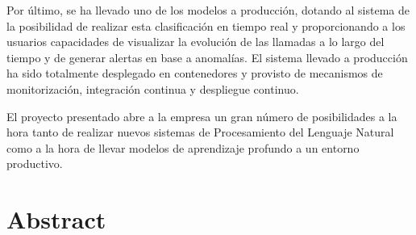  Por último, se ha llevado uno de los modelos a producción, dotando al sistema de la posibilidad de realizar esta clasificación en tiempo real y proporcionando a los usuarios capacidades de visualizar la evolución de las llamadas a lo largo del tiempo y de generar alertas en base a anomalías. El sistema llevado a producción ha sido totalmente desplegado en contenedores y provisto de mecanismos  de monitorización, integración continua y despliegue continuo. 
 
El proyecto presentado abre a la empresa un gran número de posibilidades a la hora tanto de  realizar nuevos sistemas de Procesamiento del Lenguaje Natural como a la hora de llevar modelos de aprendizaje profundo a un entorno productivo.
 








\chapter*{Abstract}






\onehalfspacing


